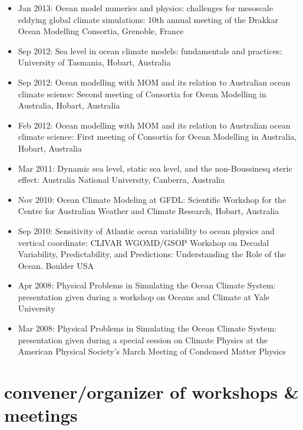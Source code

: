 \documentclass{article}
\begin{document}
\begin{itemize}[leftmargin=*]
\item Jan 2013: {\sc Ocean model numerics and physics: challenges for
    mesoscale eddying global climate simulations}: 10th annual meeting
  of the Drakkar Ocean Modelling Consortia, Grenoble, France

\item Sep 2012: {\sc Sea level in ocean climate models: fundamentals
    and practices}: University of Tasmania, Hobart, Australia

\item Sep 2012: {\sc Ocean modelling with MOM and its relation to
    Australian ocean climate science}: Second meeting of Consortia for
  Ocean Modelling in Australia, Hobart, Australia

\item Feb 2012: {\sc Ocean modelling with MOM and its relation to
    Australian ocean climate science}: First meeting of Consortia for
  Ocean Modelling in Australia, Hobart, Australia

\item Mar 2011: {\sc Dynamic sea level, static sea level, and the
    non-Boussinesq steric effect}: Australia National University,
  Canberra, Australia

\item Nov 2010:  {\sc Ocean Climate Modeling at GFDL}: Scientific
  Workshop for the Centre for Australian Weather and Climate Research,
  Hobart, Australia

\item Sep 2010:  {\sc Sensitivity of Atlantic ocean variability to
    ocean physics and vertical coordinate}: CLIVAR WGOMD/GSOP Workshop
  on Decadal Variability, Predictability, and Predictions:
  Understanding the Role of the Ocean. Boulder USA 

\item Apr 2008:  {\sc Physical Problems in Simulating the Ocean
    Climate System}: presentation given during a workshop on Oceans
  and Climate at Yale University 

\item Mar 2008:  {\sc Physical Problems in Simulating the Ocean
    Climate System}: presentation given during a special session on
  Climate Physics at the American Physical Society's March Meeting of
  Condensed Matter Physics 


\end{itemize}


\section*{\sc  \color{Maroon}  convener/organizer of workshops \& meetings}
\vspace{-.3cm}
\end{document}
